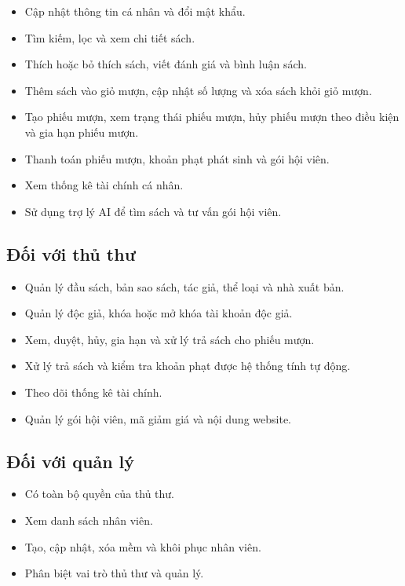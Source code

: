 \documentclass[../main.tex]{subfiles}
\begin{document}
\begin{itemize}
    \item Cập nhật thông tin cá nhân và đổi mật khẩu.
    \item Tìm kiếm, lọc và xem chi tiết sách.
    \item Thích hoặc bỏ thích sách, viết đánh giá và bình luận sách.
    \item Thêm sách vào giỏ mượn, cập nhật số lượng và xóa sách khỏi giỏ mượn.
    \item Tạo phiếu mượn, xem trạng thái phiếu mượn, hủy phiếu mượn theo điều kiện và gia hạn phiếu mượn.
    \item Thanh toán phiếu mượn, khoản phạt phát sinh và gói hội viên.
    \item Xem thống kê tài chính cá nhân.
    \item Sử dụng trợ lý AI để tìm sách và tư vấn gói hội viên.
\end{itemize}

\subsection{Đối với thủ thư}

\begin{itemize}
    \item Quản lý đầu sách, bản sao sách, tác giả, thể loại và nhà xuất bản.
    \item Quản lý độc giả, khóa hoặc mở khóa tài khoản độc giả.
    \item Xem, duyệt, hủy, gia hạn và xử lý trả sách cho phiếu mượn.
    \item Xử lý trả sách và kiểm tra khoản phạt được hệ thống tính tự động.
    \item Theo dõi thống kê tài chính.
    \item Quản lý gói hội viên, mã giảm giá và nội dung website.
\end{itemize}

\subsection{Đối với quản lý}

\begin{itemize}
    \item Có toàn bộ quyền của thủ thư.
    \item Xem danh sách nhân viên.
    \item Tạo, cập nhật, xóa mềm và khôi phục nhân viên.
    \item Phân biệt vai trò thủ thư và quản lý.
\end{itemize}
\end{document}
